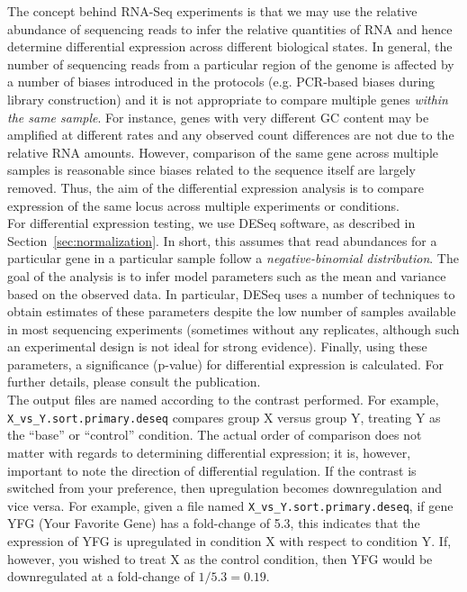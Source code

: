 \documentclass{article}
\begin{document}
{{{The concept behind RNA-Seq experiments is that we may use the relative abundance of sequencing reads to infer the relative quantities of RNA and hence determine differential expression across different biological states.  In general, the number of sequencing reads from a particular region of the genome is affected by a number of biases introduced in the protocols (e.g. PCR-based biases during library construction) and it is not appropriate to compare multiple genes \emph{within the same sample}.  For instance, genes with very different GC content may be amplified at different rates and any observed count differences are not due to the relative RNA amounts.  However, comparison of the same gene across multiple samples is reasonable since biases related to the sequence itself are largely removed.  Thus, the aim of the differential expression analysis is to compare expression of the same locus across multiple experiments or conditions.\\

For differential expression testing, we use DESeq software, as described in Section~\ref{sec:normalization}.  In short, this assumes that read abundances for a particular gene in a particular sample follow a \emph{negative-binomial distribution}.  The goal of the analysis is to infer model parameters such as the mean and variance based on the observed data.  In particular, DESeq uses a number of techniques to obtain estimates of these parameters despite the low number of samples available in most sequencing experiments (sometimes without any replicates, although such an experimental design is not ideal for strong evidence).  Finally, using these parameters, a significance (p-value) for differential expression is calculated. For further details, please consult the publication.\\  

The output files are named according to the contrast performed.  For example, \verb|X_vs_Y.sort.primary.deseq| compares group X versus group Y, treating Y as the ``base'' or ``control'' condition.  The actual order of comparison does not matter with regards to determining differential expression; it is, however, important to note the direction of differential regulation.  If the contrast is switched from your preference, then upregulation becomes downregulation and vice versa.  For example, given a file named \verb|X_vs_Y.sort.primary.deseq|, if gene YFG (Your Favorite Gene) has a fold-change of 5.3, this indicates that the expression of YFG is upregulated in condition X with respect to condition Y.  If, however, you wished to treat X as the control condition, then YFG would be downregulated at a fold-change of $1/5.3 = 0.19$.   \\

}}}
\end{document}
